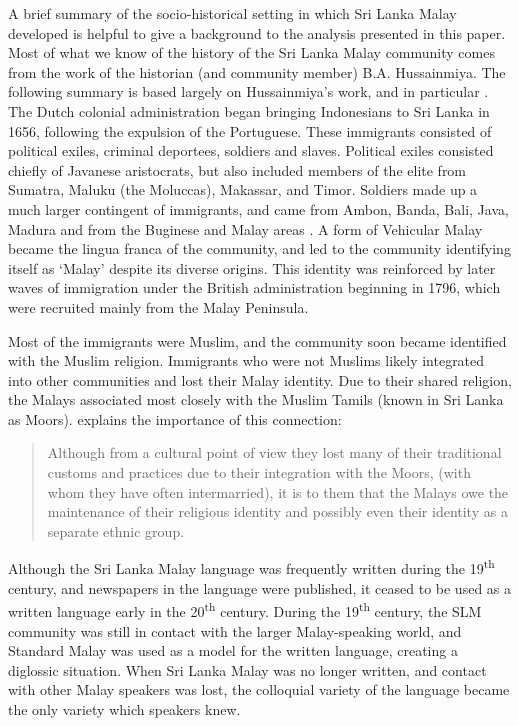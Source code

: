 A brief summary of the socio-historical setting in which Sri Lanka Malay developed is helpful to give a background to the analysis presented in this paper. Most of what we know of the history of the Sri Lanka Malay community comes from the work of the historian (and community member) B.A. Hussainmiya. The following summary is based largely on Hussainmiya's work, and in particular \citet{Hussainmiya1987 and 2008}. The Dutch colonial administration began bringing Indonesians to Sri Lanka in 1656, following the expulsion of the Portuguese. These immigrants consisted of political exiles, criminal deportees, soldiers and slaves. Political exiles consisted chiefly of Javanese aristocrats, but also included members of the elite from Sumatra, Maluku (the Moluccas), Makassar, and Timor. Soldiers made up a much larger contingent of immigrants, and came from Ambon, Banda, Bali, Java, Madura and from the Buginese and Malay areas \citep[24]{Adelaar1991}. A form of Vehicular Malay became the lingua franca of the community, and led to the community identifying itself as `Malay' despite its diverse origins. This identity was reinforced by later waves of immigration under the British administration beginning in 1796, which were recruited mainly from the Malay Peninsula.

Most of the immigrants were Muslim, and the community soon became identified with the Muslim religion. Immigrants who were not Muslims likely integrated into other communities and lost their Malay identity. Due to their shared religion, the Malays associated most closely with the Muslim Tamils (known in Sri Lanka as Moors). \citet[24]{Adelaar1991} explains the importance of this connection: 

\begin{quote}
Although from a cultural point of view they lost many of their traditional customs and practices due to their integration with the Moors, (with whom they have often intermarried), it is to them that the Malays owe the maintenance of their religious identity and possibly even their identity as a separate ethnic group.
\end{quote}

Although the Sri Lanka Malay language was frequently written during the 19\textsuperscript{th} century, and newspapers in the language were published, it ceased to be used as a written language early in the 20\textsuperscript{th} century. During the 19\textsuperscript{th} century, the SLM community was still in contact with the larger Malay-speaking world, and Standard Malay was used as a model for the written language, creating a diglossic situation. When Sri Lanka Malay was no longer written, and contact with other Malay speakers was lost, the colloquial variety of the language became the only variety which speakers knew.

